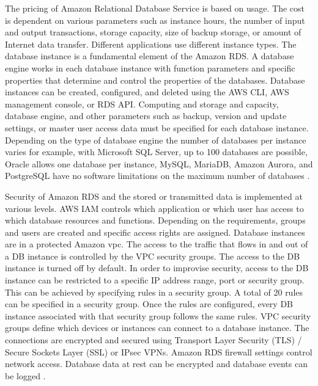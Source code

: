 \par The pricing of Amazon Relational Database Service is based on usage.
The cost is dependent on various parameters such as instance hours, the number of input and output transactions, storage capacity, size of backup storage, or amount of Internet data transfer.
Different applications use different instance types.
The database instance is a fundamental element of the
Amazon RDS. A database engine works in each database instance with function parameters and specific properties that determine and control the properties of the databases. Database instances can be created, configured, and deleted using the AWS CLI, AWS management console, or RDS API. Computing and storage and capacity, database engine, and other parameters such as backup, version and update settings, or master user access data must be specified for each database instance. Depending on the type of database engine the number of databases per instance varies for example, with Microsoft SQL Server, up to 100 databases are possible, Oracle allows one database per instance, MySQL, MariaDB, Amazon Aurora, and PostgreSQL have no software limitations on the maximum number of databases \cite{37}.

\par Security of Amazon RDS and the stored or transmitted data is implemented at various levels.
AWS IAM controls which application or which user has access to which database resources and functions.
Depending on the requirements, groups and users are created and specific access rights are assigned.
Database instances are in a protected Amazon \gls{vpc}.
The access to the traffic that flows in and out of a DB instance is controlled by the VPC security groups.
The access to the DB instance is turned off by default.
In order to improvise security, access to the DB instance can be restricted to a specific IP address range, port or security group.
This can be achieved by specifying rules in a security group.
A total of 20 rules can be specified in a security group.
Once the rules are configured, every DB instance associated with that security group follows the same rules.
VPC security groups define which devices or instances can connect to a database instance.
The connections are encrypted and secured using Transport Layer Security (TLS) / Secure Sockets Layer (SSL) or IPsec VPNs. Amazon RDS firewall settings control network access. Database data at rest can be encrypted and database events can be logged \cite{71}.

